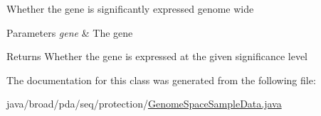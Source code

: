 Whether the gene is significantly expressed genome wide 
\begin{DoxyParams}{Parameters}
{\em gene} & The gene \\
\hline
\end{DoxyParams}
\begin{DoxyReturn}{Returns}
Whether the gene is expressed at the given significance level 
\end{DoxyReturn}


The documentation for this class was generated from the following file\+:\begin{DoxyCompactItemize}
\item 
java/broad/pda/seq/protection/\hyperlink{protection_2_genome_space_sample_data_8java}{Genome\+Space\+Sample\+Data.\+java}\end{DoxyCompactItemize}

